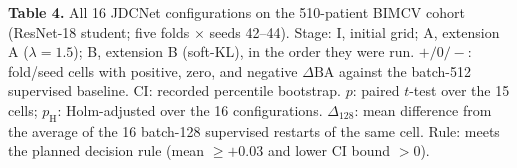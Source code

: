\documentclass[pdflatex,sn-vancouver,Numbered]{sn-jnl}
\begin{document}
\begin{minipage}{\textwidth}
{\small\noindent\textbf{Table 4.} All 16 JDCNet configurations on the 510-patient BIMCV cohort (ResNet-18 student; five folds $\times$ seeds 42--44). Stage: I, initial grid; A, extension A ($\lambda{=}1.5$); B, extension B (soft-KL), in the order they were run. $+/0/-$: fold/seed cells with positive, zero, and negative $\Delta\mathrm{BA}$ against the batch-512 supervised baseline. CI: recorded percentile bootstrap. $p$: paired $t$-test over the 15 cells; $p_{\mathrm{H}}$: Holm-adjusted over the 16 configurations. $\Delta_{128}$: mean difference from the average of the 16 batch-128 supervised restarts of the same cell. Rule: meets the planned decision rule (mean $\geq+0.03$ and lower CI bound $>0$).\par}
\vspace{6pt}



\end{minipage}
\end{document}
